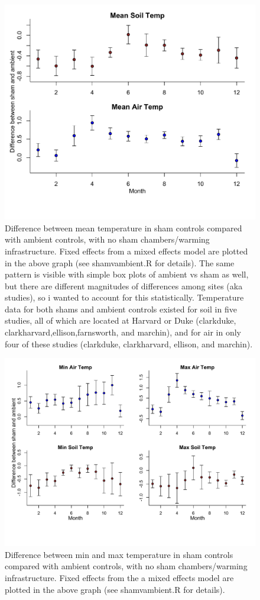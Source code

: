 \documentclass{article}
\begin{document}
\begin{figure}[p]
    \centering
\includegraphics{Analyses/figures/ShamVSAmbient_mean.pdf}    
\caption{Difference between mean temperature in sham controls compared with ambient controls, with no sham chambers/warming infrastructure. Fixed effects from a mixed effects model are plotted in the above graph (see shamvambient.R for details). The same pattern is visible with simple box plots of ambient vs sham as well, but there are different magnitudes of differences among sites (aka studies), so i wanted to account for this statistically. Temperature data for both shams and ambient controls existed for soil in five studies, all of which are located at Harvard or Duke (clarkduke, clarkharvard,ellison,farnsworth, and marchin), and for air in only four of these studies (clarkduke, clarkharvard, ellison, and marchin). }
\end{figure}
\begin{figure}[p]
    \centering
\includegraphics{Analyses/figures/ShamVSAmbient_minmax.pdf}    
\caption{Difference between min and max temperature in sham controls compared with ambient controls, with no sham chambers/warming infrastructure. Fixed effects from the a mixed effects model are plotted in the above graph (see shamvambient.R for details). }
\end{figure}
\end{document}
